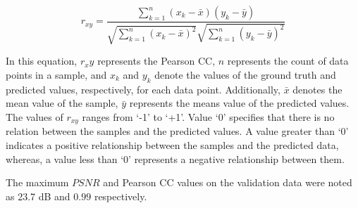 \begin{equation}
	r_{x 
		y}=\frac{\sum_{k=1}^n\left(x_k-\bar{x}\right)\left(y_k-\bar{y}\right)}{\sqrt{\sum_{k=1}^n\left(x_k-\bar{x}\right)^2}
		\sqrt{\sum_{k=1}^n\left(y_k-\bar{y}\right)^2}}
	\label{eqn:pearsoncc}
\end{equation}

In this equation, $r_xy$ represents the Pearson CC, \(n\) represents the 
count of data points in a sample, and $x_k$ and $y_k$ denote the values 
of the ground truth and predicted values, respectively, for each data point. 
Additionally, $\bar{x}$ denotes the mean value of the sample, $\bar{y}$ 
represents the means value of the predicted values. 
The values of $r_{xy}$ ranges from ‘-1’ to ‘+1’. 
Value ‘0’ specifies that there is no relation between the samples and the 
predicted values. 
A value greater than ‘0’ indicates a positive relationship between the 
samples 
and the predicted data, whereas, a value less than ‘0’ represents a 
negative relationship between them.

The maximum \(PSNR\) and Pearson CC values on the validation data were noted as 
23.7 dB and \(0.99\) respectively.